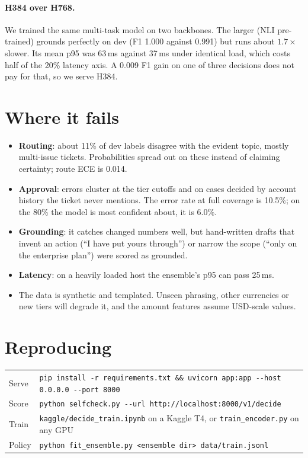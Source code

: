 \documentclass[11pt,a4paper]{article}
\begin{document}
\paragraph{H384 over H768.}

We trained the same multi-task model on two backbones. The larger
 (NLI pre-trained) grounds perfectly
on dev (F1 1.000 against 0.991) but runs about $1.7\times$ slower. Its mean p95 was
63\,ms against 37\,ms under identical load, which costs half of the 20\% latency
axis. A 0.009 F1 gain on one of three decisions does not pay for that, so we
serve H384.

\section{Where it fails}

\begin{itemize}
  \item \textbf{Routing}: about 11\% of dev labels disagree with the evident topic,
        mostly multi-issue tickets. Probabilities spread out on these instead of
        claiming certainty; route ECE is 0.014.
  \item \textbf{Approval}: errors cluster at the tier cutoffs and on cases decided by
        account history the ticket never mentions. The error rate at full
        coverage is 10.5\%; on the 80\% the model is most confident about, it is 6.0\%.
  \item \textbf{Grounding}: it catches changed numbers well, but hand-written
        drafts that invent an action (``I have put yours through'') or narrow
        the scope (``only on the enterprise plan'') were scored as grounded.
  \item \textbf{Latency}: on a heavily loaded host the ensemble's p95 can pass 25\,ms.
  \item The data is synthetic and templated. Unseen phrasing, other currencies or
        new tiers will degrade it, and the amount features assume USD-scale values.
\end{itemize}

\section{Reproducing}

\begin{tabularx}{\linewidth}{@{}l>{\raggedright\arraybackslash}X@{}}
Serve & \texttt{pip install -r requirements.txt \&\& uvicorn app:app -{}-host 0.0.0.0 -{}-port 8000} \\
Score & \texttt{python selfcheck.py -{}-url http://localhost:8000/v1/decide} \\
Train & \texttt{kaggle/decide\_train.ipynb} on a Kaggle T4, or \texttt{train\_encoder.py} on any GPU \\
Policy & \texttt{python fit\_ensemble.py <ensemble dir> data/train.jsonl} \\
\end{tabularx}
\end{document}
